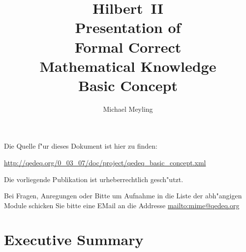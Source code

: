 \documentclass[a4paper,german,10pt,twoside]{book}
\title{\textbf{Hilbert~II} \\
\vspace*{1cm} 
Presentation of \\ 
Formal Correct \\
Mathematical Knowledge \\
\vspace*{1cm} Basic Concept}
\author{
Michael Meyling
}
\theoremstyle{definition}
\theoremstyle{remark}
\begin{document}
\maketitle

\setlength{\parskip}{5pt plus 2pt minus 1pt}
\mbox{}
\vfill

\par
Die Quelle f{"ur} dieses Dokument ist hier zu finden:
\par
\url{http://qedeq.org/0_03_07/doc/project/qedeq_basic_concept.xml}

\par
Die vorliegende Publikation ist urheberrechtlich gesch{"u}tzt.
\par
Bei Fragen, Anregungen oder Bitte um Aufnahme in die Liste der abh{"a}ngigen Module schicken Sie bitte eine EMail an die Addresse \url{mailto:mime@qedeq.org}

\setlength{\parskip}{0pt}
\tableofcontents

\setlength{\parskip}{5pt plus 2pt minus 1pt}

\chapter*{Executive Summary} \label{chapter0} \hypertarget{chapter0}{}
\end{document}
